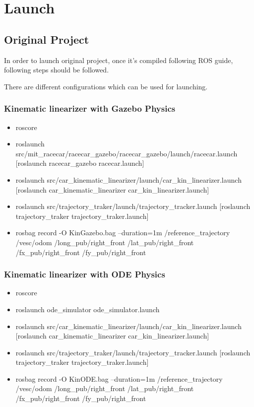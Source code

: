 \documentclass[12pt, letterpaper]{report}
\begin{document}
\section{Launch}

\subsection{Original Project}

In order to launch original project, once it's compiled following ROS guide, following steps should be followed.

There are different configurations which can be used for launching.

\subsubsection{Kinematic linearizer with Gazebo Physics}

\begin{itemize}
	\item roscore
	\item roslaunch src/mit\_racecar/racecar\_gazebo/racecar\_gazebo/launch/racecar.launch [roslaunch racecar\_gazebo racecar.launch]
	\item roslaunch src/car\_kinematic\_linearizer/launch/car\_kin\_linearizer.launch [roslaunch car\_kinematic\_linearizer car\_kin\_linearizer.launch]
	\item roslaunch src/trajectory\_traker/launch/trajectory\_tracker.launch [roslaunch trajectory\_traker trajectory\_traker.launch]
	\item rosbag record -O KinGazebo.bag --duration=1m /reference\_trajectory /vesc/odom /long\_pub/right\_front /lat\_pub/right\_front /fx\_pub/right\_front /fy\_pub/right\_front
\end{itemize}

\subsubsection{Kinematic linearizer with ODE Physics}

\begin{itemize}
	\item roscore
	\item roslaunch ode\_simulator ode\_simulator.launch
	\item roslaunch src/car\_kinematic\_linearizer/launch/car\_kin\_linearizer.launch [roslaunch car\_kinematic\_linearizer car\_kin\_linearizer.launch]
	\item roslaunch src/trajectory\_traker/launch/trajectory\_tracker.launch [roslaunch trajectory\_traker trajectory\_traker.launch]
	\item rosbag record -O KinODE.bag --duration=1m /reference\_trajectory /vesc/odom /long\_pub/right\_front /lat\_pub/right\_front /fx\_pub/right\_front /fy\_pub/right\_front
\end{itemize}
\end{document}
